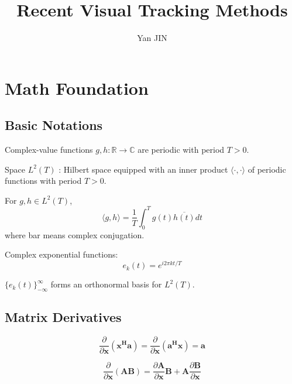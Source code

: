 \documentclass[12pt]{article}
\numberwithin{equation}{section}
\begin{document}
\small
\title{Recent Visual Tracking Methods}
\author{Yan JIN}
\pagestyle{fancy}\fancyhf{}
\lhead{}
\lfoot{\textit{}}\cfoot{}\rfoot{\thepage}
\renewcommand{\headrulewidth}{1.pt}
\renewcommand{\footrulewidth}{1.pt}
\maketitle
\tableofcontents
\section{Math Foundation}
\subsection{Basic Notations}
Complex-value functions $g, h: \mathbb{R} \rightarrow \mathbb{C}$ are periodic with period $T > 0$. \par
Space $L^2(T)$ : Hilbert space equipped with an inner product $\langle \cdot , \cdot \rangle$ of periodic functions with period $T>0$. \par
For $g, h \in L^2(T)$, 
\begin{equation}\label{eq:conj}
	\langle g,h \rangle = \frac{1}{T} \int^{T}_{0} g(t) \overline{h(t)} dt
\end{equation}
where bar means complex conjugation. \par
Complex exponential functions: 
\begin{equation}
	e_k(t) = e^{i 2\pi kt/T}
\end{equation} \par
$\{e_k(t)\}^{\infty}_{-\infty}$ forms an orthonormal basis for $L^2(T)$. \par

\subsection{Matrix Derivatives \cite{nasrabadi2007pattern}}
\begin{equation} \label{eq:matrixderivativ1}
	\frac{\partial}{\partial \bm{x}}(\bm{x^Ha}) = 
	\frac{\partial}{\partial \bm{x}}(\bm{a^Hx})= \bm{a}
\end{equation}

\begin{equation} \label{eq:matrixderivativ2}
	\frac{\partial}{\partial \bm{x}}(\bm{AB}) = 
	\frac{\partial \bm{A}}{\partial \bm{x}} \bm{B} + \bm{A} \frac{\partial \bm{B}}{\partial \bm{x}} 
\end{equation}
\end{document}
